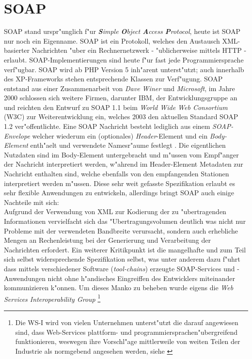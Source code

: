 \section{SOAP}
\label{sec:background:soap}
SOAP stand urspr"unglich f"ur \emph{\textbf{S}imple \textbf{O}bject \textbf{A}ccess \textbf{P}rotocol},
heute ist SOAP nur noch ein Eigenname.
SOAP ist ein Protokoll, welches den Austausch XML-basierter Nachrichten "uber ein Rechnernetzwerk - "ublicherweise
mittels HTTP - erlaubt. SOAP-Implementierungen sind heute f"ur fast jede Programmiersprache verf"ugbar. SOAP wird
ab PHP Version 5 inh"arent unterst"utzt; auch innerhalb des XP-Frameworks stehen entsprechende Klassen zur Verf"ugung.
SOAP entstand aus einer Zusammenarbeit von \emph{Dave Winer} und \emph{Microsoft}, im Jahre 2000 schlossen sich 
weitere Firmen, darunter IBM, der Entwicklungsgruppe an und reichten den Entwurf zu SOAP 1.1 beim 
\emph{World Wide Web Consortium} (W3C) zur Weiterentwicklung ein, welches 2003 den aktuellen Standard SOAP 1.2
ver"offentlichte.
Eine SOAP Nachricht besteht lediglich aus einem \emph{SOAP-Envelope} welcher wiederum ein (optionales) \emph{Header}-Element
und ein \emph{Body-Element} enth"aelt und verwendete Namesr"aume festlegt \cite{SOAPSPEC}. Die eigentlichen Nutzdaten sind
im Body-Element untergebracht und m"ussen vom Empf"anger der Nachricht interpretiert werden, w"ahrend im Header-Element Metadaten
zur Nachricht enthalten sind, welche ebenfalls von den empfangenden Stationen interpretiert werden m"ussen. Diese sehr weit gefasste
Spezifikation erlaubt es sehr flexible Anwendungen zu entwickeln, allerdings bringt SOAP auch einige Nachteile mit sich:\\
Aufgrund der Verwendung von XML zur Kodierung der zu "ubertragenden Informationen vervielfacht sich das "Ubertragungsvolumen
deutlich was nicht nur Probleme mit der verwendeten Bandbreite verursacht, sondern auch
erhebliche Mengen an Rechenleistung bei der Generierung und Verarbeitung der Nachrichten erfordert. Ein weiterer Kritikpunkt ist
die mangelhafte und zum Teil sich selbst widersprechende Spezifikation selbst, was unter anderem dazu f"uhrt dass mittels verschiedener
Software (\emph{tool-chains}) erzeugte SOAP-Services und -Anwendungen nicht ohne h"andisches Eingreiffen des Entwicklers miteinander kommunizieren 
k"onnen. Um dieses Manko zu beheben wurde eigens die \emph{Web Services Interoperability Group} \footnote{
Die WS-I wird von vielen Unternehmen unterst"utzt die darauf angewiesen sind, dass Web-Services plattform- und programmiersprachen"ubergreifend
funktionieren, weswegen ihre Vorschl"age mittlerweile von weiten Teilen der Industrie als normgebend angesehen werden,
siehe \cite{WSIHP}
}
